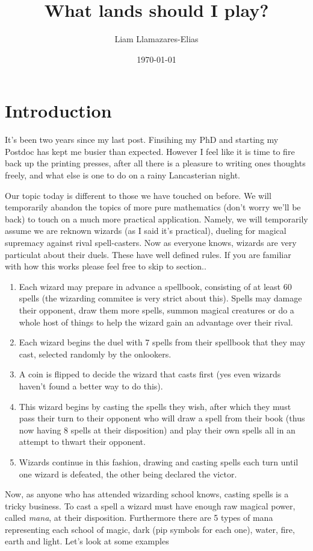 \documentclass[
    a4paper,
    DIV=13,
    abstract=true,
    numbers=noenddot
]{scrartcl}
\begin{document}
\title{What lands should I play?}
\author{Liam Llamazares-Elias}
\date{\today}
\maketitle
\section{Introduction}
It's been two years since my last post. Finsihing my PhD and starting my Postdoc has kept me busier than expected. However I feel like it is time to fire back up the printing presses, after all there is a pleasure to writing ones thoughts freely, and what else is one to do on a rainy Lancasterian night.

Our topic today is different to those we have touched on before. We will temporarily abandon the topics of more pure mathematics (don't worry we'll be back) to touch on a much more practical application. Namely, we will temporarily assume we are reknown wizards (as I said it's practical), dueling for magical supremacy against rival spell-casters. Now as everyone knows, wizards are very particulat about their duels. These have well defined rules. If you are familiar with how this works please feel free to skip to section..
\begin{enumerate}
  \item Each wizard may prepare in advance a spellbook, consisting of at least 60 spells (the wizarding commitee is very strict about this). Spells may damage their opponent, draw them more spells, summon magical creatures or do a whole host of things to help the wizard gain an advantage over their rival. 
  \item Each wizard begins the duel with 7 spells from their spellbook that they may cast, selected randomly by the onlookers.
  \item A coin is flipped to decide the wizard that casts first (yes even wizards haven't found a better way to do this).
  \item This wizard begins by casting the spells they wish, after which they must pass their turn to their opponent who will draw a spell from their book (thus now having 8 spells at their disposition) and play their own spells all in an attempt to thwart their opponent.
  \item Wizards continue in this fashion, drawing and casting spells each turn until one wizard is defeated, the other being declared the victor.
\end{enumerate}
Now, as anyone who has attended wizarding school knows, casting spells is a tricky business. To cast a spell a wizard must have enough raw magical power, called \emph{mana}, at their disposition. Furthermore there are 5 types of mana representing each school of magic, dark (pip symbols for each one), water, fire, earth and light. Let's look at some examples
\end{document}
